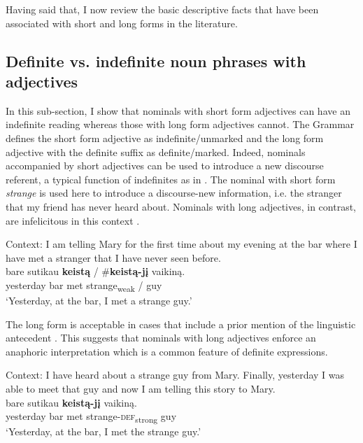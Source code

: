 \documentclass[output=paper,
modfonts
]{langscibook}
\begin{document}
Having said that, I now review the basic descriptive facts that have been associated with short and long forms in the literature. 


\subsection{Definite vs. indefinite noun phrases with adjectives} \label{sec:sereikaite:4.1}

In this sub-section, I show that nominals with short form adjectives can have an indefinite reading whereas those with long form adjectives cannot. The  Grammar \citep{Ambrazas1997} defines the short form adjective as indefinite/unmarked and the long form adjective with the definite suffix as definite/marked. Indeed, nominals accompanied by short adjectives can be used to introduce a new discourse referent, a typical function of indefinites as in . The nominal with short form \textit{strange} is used here to introduce a discourse-new information, i.e. the stranger that my friend has never heard about. Nominals with long adjectives, in contrast, are infelicitous in this context .

\begin{exe}
\ex \label{ex:sereikaite:32}
Context: I am telling Mary for the first 
time about my evening at the bar where I have met a stranger that I have never seen before. \\
 {bare} {sutikau} \textbf{keistą} \textnormal{/} \textnormal{\#}\textbf{keistą-jį} {vaikiną}. \\
yesterday bar met {strange\textsubscript{weak}} /  guy\\
\trans `Yesterday, at the bar, I met a strange guy.' \\
\end{exe}

The long form is acceptable in cases that include a prior mention of the linguistic antecedent . This suggests that nominals with long adjectives enforce an anaphoric interpretation which is a common feature of definite expressions. 
 
\begin{exe}
\ex \label{ex:sereikaite:33}
Context: I have heard about a strange guy from Mary. Finally, yesterday I was able to meet that guy and now I am telling this story to Mary.\\
 {bare} {sutikau} {\textbf{keistą-jį}} {vaikiną}. \\
yesterday bar met {strange-\textsc{def}\textsubscript{strong}} guy\\
\trans `Yesterday, at the bar, I met the strange guy.' \\
\end{exe}
\end{document}

